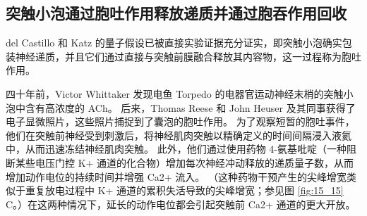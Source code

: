 \subsection{突触小泡通过胞吐作用释放递质并通过胞吞作用回收}

del Castillo 和 Katz 的量子假设已被直接实验证据充分证实，即突触小泡确实包装神经递质，并且它们通过直接与突触前膜融合释放其内容物，这一过程称为胞吐作用。


四十年前，Victor Whittaker 发现电鱼 Torpedo 的电器官运动神经末梢的突触小泡中含有高浓度的 ACh。 
后来，Thomas Reese 和 John Heuser 及其同事获得了电子显微照片，这些照片捕捉到了囊泡的胞吐作用。 为了观察短暂的胞吐事件，他们在突触前神经受到刺激后，将神经肌肉突触以精确定义的时间间隔浸入液氦中，从而迅速冻结神经肌肉突触。 
此外，他们通过使用药物 4-氨基吡啶（一种阻断某些电压门控 K+ 通道的化合物）增加每次神经冲动释放的递质量子数，从而增加动作电位的持续时间并增强 Ca2+ 流入。 
（这种药物干预产生的尖峰增宽类似于重复放电过程中 K+ 通道的累积失活导致的尖峰增宽；参见图 \ref{fig:15_15} C。）在这两种情况下，延长的动作电位都会引起突触前 Ca2+ 通道的更大开放。

